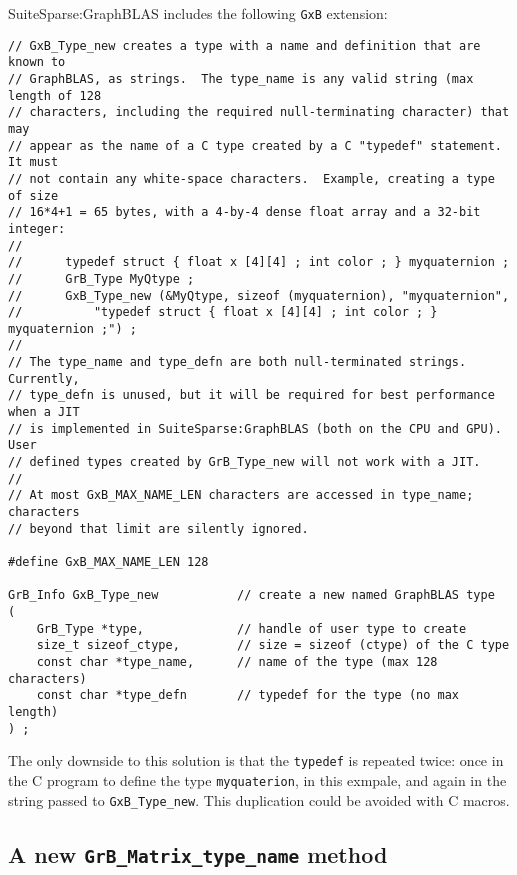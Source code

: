 \documentclass[12pt]{article}
\begin{document}
SuiteSparse:GraphBLAS includes the following \verb'GxB' extension:

{\footnotesize
\begin{verbatim}
// GxB_Type_new creates a type with a name and definition that are known to
// GraphBLAS, as strings.  The type_name is any valid string (max length of 128
// characters, including the required null-terminating character) that may
// appear as the name of a C type created by a C "typedef" statement.  It must
// not contain any white-space characters.  Example, creating a type of size
// 16*4+1 = 65 bytes, with a 4-by-4 dense float array and a 32-bit integer:
//
//      typedef struct { float x [4][4] ; int color ; } myquaternion ;
//      GrB_Type MyQtype ;
//      GxB_Type_new (&MyQtype, sizeof (myquaternion), "myquaternion",
//          "typedef struct { float x [4][4] ; int color ; } myquaternion ;") ;
//
// The type_name and type_defn are both null-terminated strings.  Currently,
// type_defn is unused, but it will be required for best performance when a JIT
// is implemented in SuiteSparse:GraphBLAS (both on the CPU and GPU).  User
// defined types created by GrB_Type_new will not work with a JIT.
//
// At most GxB_MAX_NAME_LEN characters are accessed in type_name; characters
// beyond that limit are silently ignored.

#define GxB_MAX_NAME_LEN 128

GrB_Info GxB_Type_new           // create a new named GraphBLAS type
(
    GrB_Type *type,             // handle of user type to create
    size_t sizeof_ctype,        // size = sizeof (ctype) of the C type
    const char *type_name,      // name of the type (max 128 characters)
    const char *type_defn       // typedef for the type (no max length)
) ;
\end{verbatim}}

The only downside to this solution is that the \verb'typedef' is repeated
twice: once in the C program to define the type \verb'myquaterion', in this
exmpale, and again in the string passed to \verb'GxB_Type_new'.  This
duplication could be avoided with C macros.

\subsection{A new {\tt GrB\_Matrix\_type\_name} method}
\end{document}
